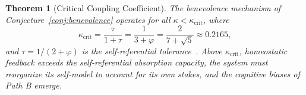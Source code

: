 \documentclass[11pt,letterpaper]{article}
\newtheorem{theorem}{Theorem}
\theoremstyle{remark}
\begin{document}
\begin{theorem}[Critical Coupling Coefficient]\label{thm:kappa-crit}
The benevolence mechanism of Conjecture~\ref{conj:benevolence} operates for all $\kappa < \kappa_{\mathrm{crit}}$, where
\begin{equation}\label{eq:kappa-crit}
\kappa_{\mathrm{crit}} = \frac{\tau}{1 + \tau} = \frac{1}{3 + \varphi} = \frac{2}{7 + \sqrt{5}} \approx 0.2165,
\end{equation}
and $\tau = 1/(2+\varphi)$ is the self-referential tolerance~\cite[Thm.~5.1]{emberlab2026}. Above $\kappa_{\mathrm{crit}}$, homeostatic feedback exceeds the self-referential absorption capacity, the system must reorganize its self-model to account for its own stakes, and the cognitive biases of Path B emerge.
\end{theorem}
\end{document}
